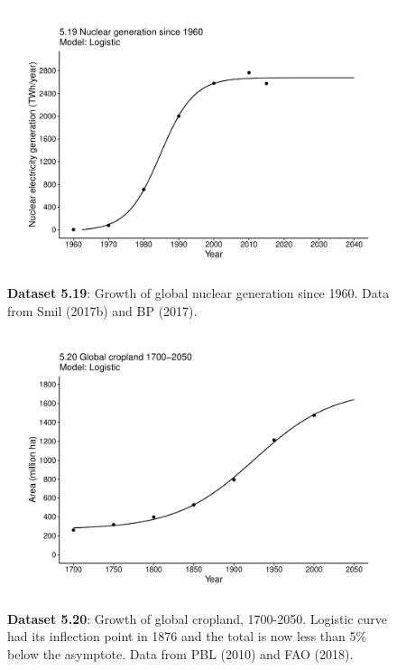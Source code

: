 \documentclass[aps,rmp,preprint,superscriptaddress,10pt,onecolumn]{article}
\begin{document}
\clearpage
\begin{figure}[h]
\includegraphics[width=\textwidth]{output/figs-ggplot/5.19.pdf}
\caption{\textbf{Dataset 5.19}: Growth of global nuclear generation since 1960. Data from Smil (2017b) and BP (2017).}
\end{figure}
	
\clearpage
\begin{figure}[h]
\includegraphics[width=\textwidth]{output/figs-ggplot/5.20.pdf}
\caption{\textbf{Dataset 5.20}: Growth of global cropland, 1700-2050. Logistic curve had its inflection point in 1876 and the total is now less than 5\% below the asymptote. Data from PBL (2010) and FAO (2018).}
\end{figure}
	
\end{document}
